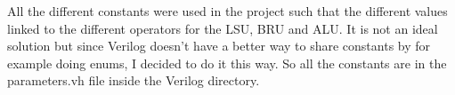 All the different constants were used in the project such that the different values linked to the different operators for 
the LSU, BRU and ALU. It is not an ideal solution but since Verilog doesn't have a better way to share 
constants by for example doing enums, I decided to do it this way. So all the constants are in the parameters.vh file inside 
the Verilog directory.